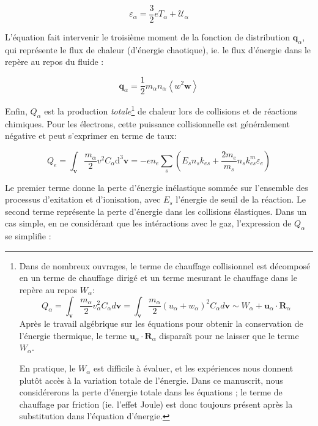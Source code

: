 \begin{refsection}
\begin{equation}
\varepsilon_\alpha=\frac{3}{2}eT_\alpha+\mathcal{U}_\alpha
\end{equation}

 L'équation fait intervenir le
troisième moment de la fonction de distribution $\mathbf q_\alpha$, qui
représente le flux de chaleur (d'énergie chaotique), ie. le flux d'énergie dans le repère au repos du fluide :

\begin{equation}
	\mathbf q_\alpha=\frac{1}{2}m_\alpha
	n_\alpha\left<w^2\mathbf w\right>
\end{equation} 

Enfin, ${Q}_\alpha$ est la production \emph{totale}\footnote{Dans de
nombreux ouvrages, le terme de chauffage collisionnel est décomposé en un terme de chauffage dirigé et un terme mesurant
le chauffage dans le repère au repos ${W}_\alpha$:
$${Q}_\alpha=\int_{\mathbf v}\frac{m_\alpha}{2}v_\alpha^2C_\alpha
d\mathbf v=\int_{\mathbf v}\frac{m_\alpha}{2}(u_\alpha+w_\alpha)^2C_\alpha d\mathbf
v\sim{W}_\alpha+\mathbf u_\alpha\cdot\mathbf R_\alpha $$ Après le
travail algébrique sur les équations pour obtenir la conservation de l'énergie
thermique, le terme $\mathbf u_\alpha\cdot\mathbf R_\alpha$ disparaît pour
ne laisser que le terme ${W}_\alpha$. 

En pratique, le
${W}_\alpha$ est difficile à évaluer, et les expériences nous donnent
plutôt accès à la variation totale de l'énergie.
Dans ce manuscrit, nous
considérerons la perte d'énergie totale dans les équations ; le terme de
chauffage par friction (ie.
l'effet Joule) est donc toujours présent après la substitution dans l'équation d'énergie.} de chaleur lors de collisions et de
réactions chimiques.
Pour les électrons, cette puissance collisionnelle est généralement négative et peut s'exprimer en terme de taux:

\begin{equation}
	Q_e=\int_{\mathbf
	v}\frac{m_\alpha}{2}v^2C_\alpha \text{d}^3\mathbf
	v=-en_e\sum_{s}\left(E_sn_sk_{es}+\frac{2m_e}{m_s}n_sk^m_{es}\varepsilon_e\right)
\end{equation}

Le premier terme donne la perte d'énergie inélastique sommée sur l'ensemble
des processus d'exitation et d'ionisation, avec $E_s$ l'énergie de seuil de la
réaction. Le second terme représente la perte d'énergie dans les collisions
élastiques. Dans un cas simple, en ne considérant que les intéractions avec le
gaz, l'expression de $Q_\alpha$ se simplifie :


\end{refsection}
